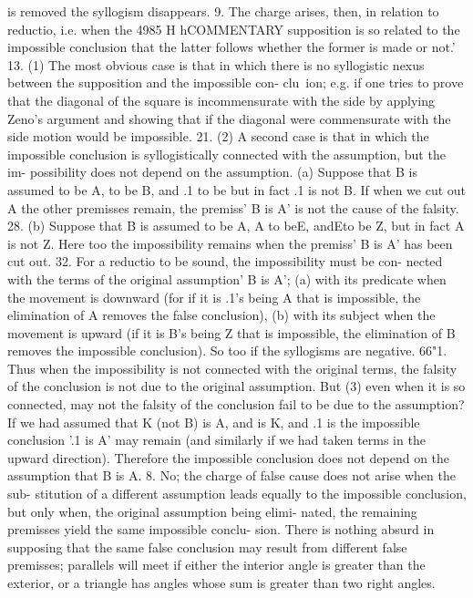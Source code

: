 {{{{{{is removed the syllogism disappears.
9. The charge arises, then, in relation to reductio, i.e. when the
4985
H hCOMMENTARY
supposition is so related to the impossible conclusion that the
latter follows whether the former is made or not.'
13. (1) The most obvious case is that in which there is no
syllogistic nexus between the supposition and the impossible con-
clu~ion; e.g. if one tries to prove that the diagonal of the square
is incommensurate with the side by applying Zeno's argument and
showing that if the diagonal were commensurate with the side
motion would be impossible.
21. (2) A second case is that in which the impossible conclusion
is syllogistically connected with the assumption, but the im-
possibility does not depend on the assumption. (a) Suppose that
B is assumed to be A, to be B, and .1 to be
but in fact .1 is
not B. If when we cut out A the other premisses remain, the
premiss' B is A' is not the cause of the falsity.
28. (b) Suppose that B is assumed to be A, A to beE, andEto
be Z, but in fact A is not Z. Here too the impossibility remains
when the premiss' B is A' has been cut out.
32. For a reductio to be sound, the impossibility must be con-
nected with the terms of the original assumption' B is A'; (a)
with its predicate when the movement is downward (for if it is .1's
being A that is impossible, the elimination of A removes the false
conclusion), (b) with its subject when the movement is upward
(if it is B's being Z that is impossible, the elimination of B removes
the impossible conclusion). So too if the syllogisms are negative.
66"1. Thus when the impossibility is not connected with the
original terms, the falsity of the conclusion is not due to the
original assumption. But (3) even when it is so connected, may
not the falsity of the conclusion fail to be due to the assumption?
If we had assumed that K (not B) is A, and is K, and .1 is
the impossible conclusion '.1 is A' may remain (and similarly if
we had taken terms in the upward direction). Therefore the
impossible conclusion does not depend on the assumption that
B is A.
8. No; the charge of false cause does not arise when the sub-
stitution of a different assumption leads equally to the impossible
conclusion, but only when, the original assumption being elimi-
nated, the remaining premisses yield the same impossible conclu-
sion. There is nothing absurd in supposing that the same false
conclusion may result from different false premisses; parallels will
meet if either the interior angle is greater than the exterior, or a
triangle has angles whose sum is greater than two right angles.
}}}}}}
